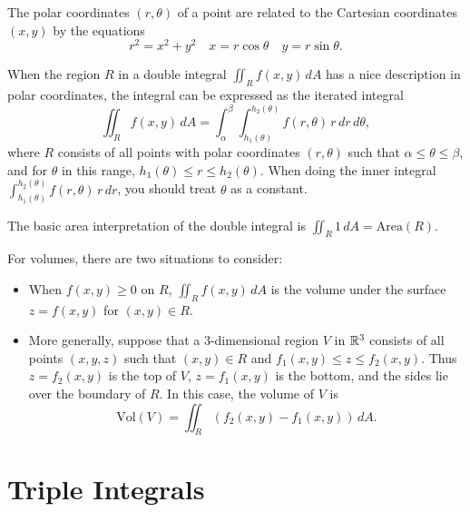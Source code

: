 \begin{fact}
	The polar coordinates $(r, \theta)$ of a point are related to the Cartesian
	coordinates $(x, y)$ by the equations
	\[
		r^2 = x^2 + y^2 \quad x = r \cos \theta \quad y = r \sin \theta.
	\]
\end{fact}

\begin{definition}
	When the region $R$ in a double integral $\iint_R f(x, y)\, dA$ has a nice
	description in polar coordinates, the integral can be expressed as the
	iterated integral
	\[
		\iint_R f(x, y)\, dA = \int_\alpha^\beta \int_{h_1(\theta)}^{h_2(\theta)}
		f(r, \theta)\, r\, dr\, d\theta,
	\]
	where $R$ consists of all points with polar coordinates $(r, \theta)$ such
	that $\alpha \leq \theta \leq \beta$, and for $\theta$ in this range,
	$h_1(\theta) \leq r \leq h_2(\theta)$. When doing the inner integral
	$\int_{h_1(\theta)}^{h_2(\theta)} f(r, \theta)\, r\, dr$, you should treat
	$\theta$ as a constant.
\end{definition}

\begin{definition}
	The basic area interpretation of the double integral is $\iint_R 1\, dA =
	\text{Area}(R)$.

	For volumes, there are two situations to consider:
	\begin{itemize}
		\item When $f(x, y) \geq 0$ on $R$, $\iint_R f(x, y)\, dA$ is the volume
			under the surface $z = f(x, y)$ for $(x, y) \in R$.
		\item More generally, suppose that a 3-dimensional region $V$ in ${\mathbb{R}}^3$
			consists of all points $(x, y, z)$ such that $(x, y) \in R$ and $f_1(x, y)
			\leq z \leq f_2(x, y)$. Thus $z = f_2(x, y)$ is the top of $V$, $z =
			f_1(x, y)$ is the bottom, and the sides lie over the boundary of $R$. In
			this case, the volume of $V$ is
			\[
				\text{Vol}(V) = \iint_R (f_2(x, y) - f_1(x, y))\, dA.
			\]
	\end{itemize}
\end{definition}

\section*{Triple Integrals}

